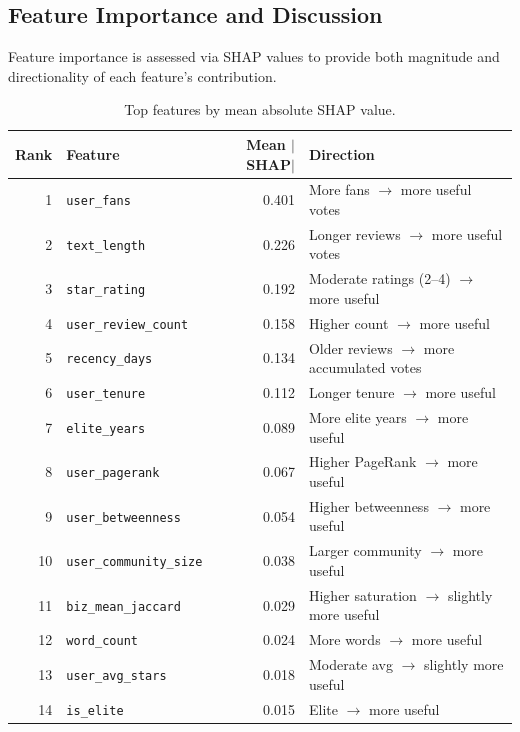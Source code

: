 \documentclass[11pt]{article}
\begin{document}
\subsection{Feature Importance and Discussion}

Feature importance is assessed via SHAP values to provide both magnitude and directionality of each feature's contribution.

\begin{table}[H]
\centering
\small
\caption{Top features by mean absolute SHAP value.}
\label{tab:pred-shap}
\begin{tabular}{r l r l}
\toprule
\rowcolor{SoftGray}
\textbf{Rank} & \textbf{Feature} & \textbf{Mean $|$SHAP$|$} & \textbf{Direction} \\
\midrule
1 & \texttt{user\_fans} & 0.401 & More fans $\to$ more useful votes \\
2 & \texttt{text\_length} & 0.226 & Longer reviews $\to$ more useful votes \\
3 & \texttt{star\_rating} & 0.192 & Moderate ratings (2--4) $\to$ more useful \\
4 & \texttt{user\_review\_count} & 0.158 & Higher count $\to$ more useful \\
5 & \texttt{recency\_days} & 0.134 & Older reviews $\to$ more accumulated votes \\
6 & \texttt{user\_tenure} & 0.112 & Longer tenure $\to$ more useful \\
7 & \texttt{elite\_years} & 0.089 & More elite years $\to$ more useful \\
8 & \texttt{user\_pagerank} & 0.067 & Higher PageRank $\to$ more useful \\
9 & \texttt{user\_betweenness} & 0.054 & Higher betweenness $\to$ more useful \\
10 & \texttt{user\_community\_size} & 0.038 & Larger community $\to$ more useful \\
11 & \texttt{biz\_mean\_jaccard} & 0.029 & Higher saturation $\to$ slightly more useful \\
12 & \texttt{word\_count} & 0.024 & More words $\to$ more useful \\
13 & \texttt{user\_avg\_stars} & 0.018 & Moderate avg $\to$ slightly more useful \\
14 & \texttt{is\_elite} & 0.015 & Elite $\to$ more useful \\
\bottomrule
\end{tabular}
\end{table}
\end{document}
